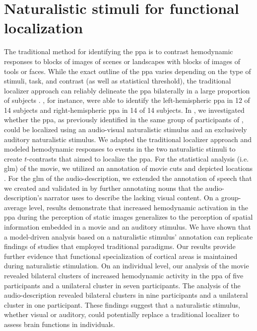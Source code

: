 \section{Naturalistic stimuli for functional localization}

%
The traditional method for identifying the \ac{ppa} is to contrast hemodynamic
responses to blocks of images of scenes or landscapes with blocks of images of
tools or faces.
%
While the exact outline of the \ac{ppa} varies depending on the type of stimuli,
task, and contrast (as well as statistical threshold), the traditional localizer
approach can reliably delineate the \ac{ppa} bilaterally in a large proportion
of subjects \citep{zhen2017quantifying}.
%
\citet{sengupta2016extension}, for instance, were able to identify the
left-hemispheric \ac{ppa} in 12 of 14 subjects and right-hemispheric \ac{ppa} in
14 of 14 subjects.
In \citet{haeusler2022processing}, we investigated whether the \ac{ppa}, as
previously identified in the same group of participants of
\citet{sengupta2016extension}, could be localized using an audio-visual
naturalistic stimulus and an exclusively auditory naturalistic stimulus.
We adapted the traditional localizer approach and modeled hemodynamic responses
to events in the two naturalistic stimuli to create $t$-contrasts that aimed to
localize the \ac{ppa}.
For the statistical analysis (i.e. \ac{glm}) of the movie, we utilized an
annotation of movie cuts and depicted locations \citep{haeusler2016cutanno}.
For the \ac{glm} of the audio-description, we extended the annotation of speech
that we created and validated in \citet{haeusler2021speechanno} by further
annotating nouns that the audio-description's narrator uses to describe the
lacking visual content.
On a group-average level, results demonstrate that increased hemodynamic
activation in the \ac{ppa} during the perception of static images generalizes to
the perception of spatial information embedded in a movie and an auditory
stimulus.
%
We have shown that a model-driven analysis based on a naturalistic
stimulus' annotation can replicate findings of studies that employed traditional
paradigms.
%
Our results provide further evidence \citep[cf.][]{bartels2004mapping} that
functional specialization of cortical areas is maintained during naturalistic
stimulation.
On an individual level, our analysis of the movie revealed bilateral clusters of
increased hemodynamic activity in the \ac{ppa} of five participants and a
unilateral cluster in seven participants.
%
The analysis of the audio-description revealed bilateral clusters in nine
participants and a unilateral cluster in one participant.
These findings suggest that a naturalistic stimulus, whether visual or auditory,
could potentially replace a traditional localizer to assess brain functions in
individuals.




